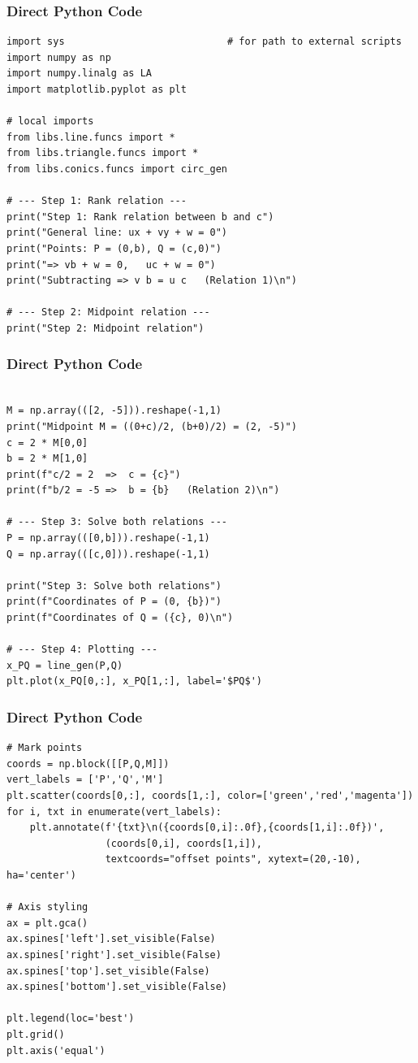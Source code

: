 \documentclass{beamer}
\begin{document}
\begin{frame}[fragile]
	\frametitle{Direct Python Code}
	\begin{lstlisting}
import sys                            # for path to external scripts
import numpy as np
import numpy.linalg as LA
import matplotlib.pyplot as plt

# local imports
from libs.line.funcs import *
from libs.triangle.funcs import *
from libs.conics.funcs import circ_gen

# --- Step 1: Rank relation ---
print("Step 1: Rank relation between b and c")
print("General line: ux + vy + w = 0")
print("Points: P = (0,b), Q = (c,0)")
print("=> vb + w = 0,   uc + w = 0")
print("Subtracting => v b = u c   (Relation 1)\n")

# --- Step 2: Midpoint relation ---
print("Step 2: Midpoint relation")
\end{lstlisting}
\end{frame}
\begin{frame}[fragile]
	\frametitle{Direct Python Code}
	\begin{lstlisting}

M = np.array(([2, -5])).reshape(-1,1)
print("Midpoint M = ((0+c)/2, (b+0)/2) = (2, -5)")
c = 2 * M[0,0]
b = 2 * M[1,0]
print(f"c/2 = 2  =>  c = {c}")
print(f"b/2 = -5 =>  b = {b}   (Relation 2)\n")

# --- Step 3: Solve both relations ---
P = np.array(([0,b])).reshape(-1,1)
Q = np.array(([c,0])).reshape(-1,1)

print("Step 3: Solve both relations")
print(f"Coordinates of P = (0, {b})")
print(f"Coordinates of Q = ({c}, 0)\n")

# --- Step 4: Plotting ---
x_PQ = line_gen(P,Q)
plt.plot(x_PQ[0,:], x_PQ[1,:], label='$PQ$')
\end{lstlisting}
\end{frame}
\begin{frame}[fragile]
	\frametitle{Direct Python Code}
	\begin{lstlisting}
# Mark points
coords = np.block([[P,Q,M]])
vert_labels = ['P','Q','M']
plt.scatter(coords[0,:], coords[1,:], color=['green','red','magenta'])
for i, txt in enumerate(vert_labels):
    plt.annotate(f'{txt}\n({coords[0,i]:.0f},{coords[1,i]:.0f})',
                 (coords[0,i], coords[1,i]),
                 textcoords="offset points", xytext=(20,-10), ha='center')

# Axis styling
ax = plt.gca()
ax.spines['left'].set_visible(False)
ax.spines['right'].set_visible(False)
ax.spines['top'].set_visible(False)
ax.spines['bottom'].set_visible(False)

plt.legend(loc='best')
plt.grid()
plt.axis('equal')
\end{lstlisting}
\end{frame}
\end{document}

